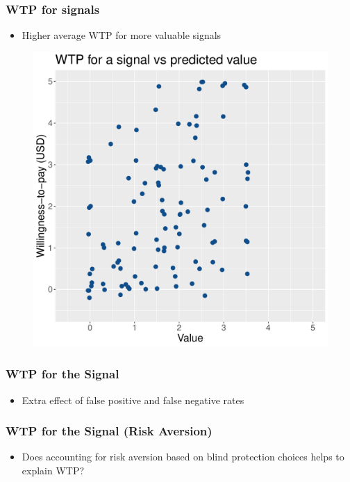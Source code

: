 \documentclass[11pt,hyperref={bookmarks=false}]{beamer}
\begin{document}
\begin{frame}
\frametitle{WTP for signals}
\begin{itemize}
\item Higher average WTP for more valuable signals
\end{itemize}
\begin{figure}[h]
\includegraphics[scale=0.45]{Graphs/WTP_curve2.pdf}
\end{figure}
\end{frame}


\begin{frame}
\frametitle{WTP for the Signal}
\begin{itemize}
\item Extra effect of false positive and false negative rates
\end{itemize}

\footnotesize

\end{frame}


\begin{frame}
\frametitle{WTP for the Signal (Risk Aversion)}
\begin{itemize}
\item Does accounting for risk aversion based on blind protection choices helps to explain WTP?
\end{itemize}
\footnotesize

\end{frame}
\end{document}
